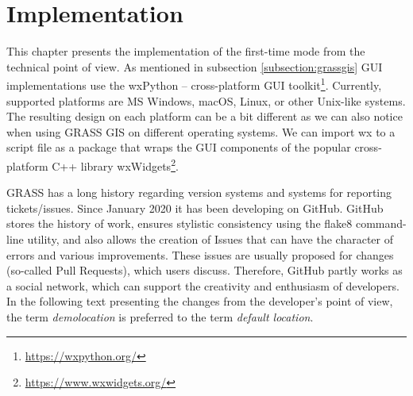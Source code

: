 \documentclass[a4paper,10pt,twoside]{article}
\begin{document}
\newpage
\vspace*{-1cm}
\section{Implementation}
\label{sec:implementation}
\noindent
\large

\noindent This chapter presents the implementation of the first-time mode 
from the technical point of view. As mentioned in subsection
\ref{subsection:grassgis} GUI implementations use the wxPython
-- cross-platform GUI toolkit\footnote{\url{https://wxpython.org/}}.
Currently, supported platforms are MS Windows, macOS,
Linux, or other Unix-like systems. The resulting design on each
platform can be a bit different as we can also notice when using GRASS
GIS on different operating systems. We can import wx to a script file as a
package that wraps the GUI components of the popular
cross-platform C++ library wxWidgets\footnote{\url{https://www.wxwidgets.org/}}.

GRASS has a long history regarding version systems and
systems for reporting tickets/issues. Since January 2020 it has been developing on 
GitHub. GitHub stores the history of work, ensures stylistic consistency using the 
flake8 command-line utility, and also allows the creation of Issues that can have
the character of errors and various improvements. These issues are usually 
proposed for changes (so-called Pull Requests), which users discuss. Therefore, 
GitHub partly works as a social network, which can support the creativity and 
enthusiasm of developers. In the following text presenting the changes from 
the developer's point of view, the term \textit{demolocation} is preferred to 
the term \textit{default location}.
\end{document}
